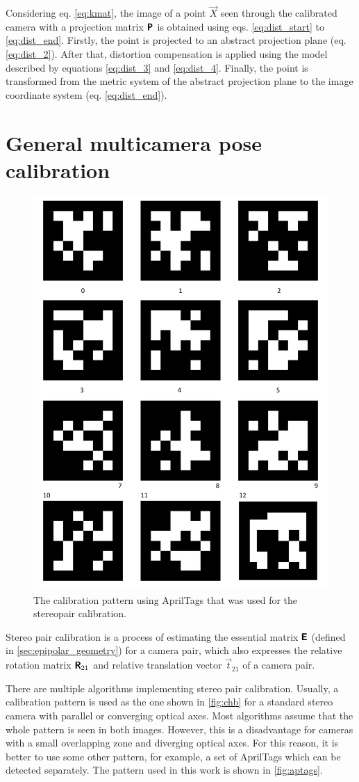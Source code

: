 Considering eq. \eqref{eq:kmat}, the image of a point $\vec{X}$ seen through the calibrated camera with a projection matrix $\pmb{\mathsf{P}}$ is obtained using eqs. \eqref{eq:dist_start} to \eqref{eq:dist_end}. 
Firstly, the point is projected to an abstract projection plane (eq. \eqref{eq:dist_2}). 
After that, distortion compensation is applied using the model described by equations \eqref{eq:dist_3} and \eqref{eq:dist_4}. 
Finally, the point is transformed from the metric system of the abstract projection plane to the image coordinate system (eq. \eqref{eq:dist_end}).

\section{General multicamera pose calibration}
\label{sec:stereocalib}

\begin{figure}[h]
    \centering
    \includegraphics[width=.2\textwidth]{graphics/aptags.png}
    \caption[The calibration pattern using AprilTags.]{The calibration pattern using AprilTags that was used for the stereopair calibration.}
    \label{fig:aptags}
\end{figure}

Stereo pair calibration is a process of estimating the essential matrix $\pmb{\mathsf{E}}$ (defined in \autoref{sec:epipolar_geometry}) for a camera pair, which also expresses the relative rotation matrix $\pmb{\mathsf{R}}_{21}$ and relative translation vector $\vec{t}_{21}$ of a camera pair. 

There are multiple algorithms implementing stereo pair calibration.
Usually, a calibration pattern is used as the one shown in \autoref{fig:chb} for a standard stereo camera with parallel or converging optical axes.
Most algorithms assume that the whole pattern is seen in both images.
However, this is a disadvantage for cameras with a small overlapping zone and diverging optical axes.
For this reason, it is better to use some other pattern, for example, a set of AprilTags \cite{Malyuta2019} which can be detected separately. 
The pattern used in this work is shown in \autoref{fig:aptags}.

